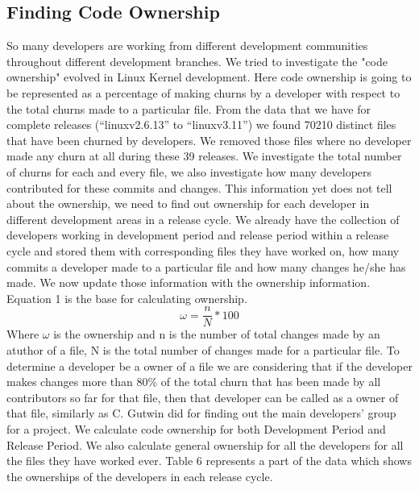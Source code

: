 \documentclass{acm_proc_article-sp}
\begin{document}
\subsection{Finding Code Ownership}
So many developers are working from different development communities throughout different development branches. We tried to investigate the "code ownership" \cite{mockus_case_study} evolved in Linux Kernel development. Here code ownership is going to be represented as a percentage of making churns by a developer with respect to the total churns made to a particular file. From the data that we have for complete releases (``linuxv2.6.13'' to ``linuxv3.11'') we found 70210 distinct files that have been churned by developers. We removed those files where no developer made any churn at all during these 39 releases. We investigate the total number of churns for each and every file, we also investigate how many developers contributed for these commits and changes. This information yet does not tell about the ownership, we need to find out ownership for each developer in different development areas in a release cycle. We already have the collection of developers working in development period and release period within a release cycle and stored them with corresponding files they have worked on, how many commits a developer made to a particular file and how many changes he/she has made. We now update those information with the ownership information. Equation 1 is the base for calculating ownership.
\begin{equation}\omega=\frac{n}{N}*100\end{equation}
Where $\omega$ is the ownership and n is the number of total changes made by an atuthor of a file, N is the total number of changes made for a particular file.
To determine a developer be a owner of a file we are considering that if the developer makes changes more than 80\% of the total churn that has been made by all contributors so far for that file, then that developer can be called as a owner of that file, similarly as C. Gutwin did \cite{gutwin_awareness} for finding out the main developers' group for a project. We calculate code ownership for both Development Period and Release Period. We also calculate general ownership for all the developers for all the files they have worked ever. Table 6 represents a part of the data which shows the ownerships of the developers in each release cycle.
\end{document}
